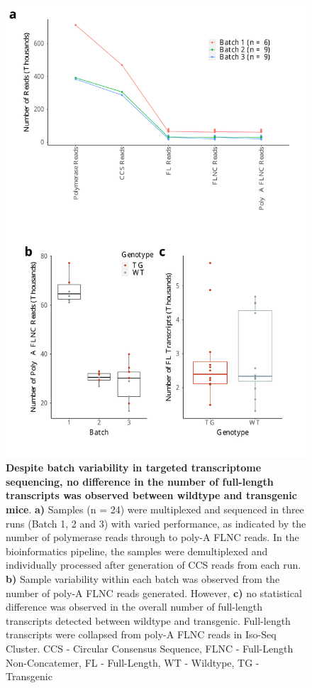 \begin{figure}[!htp]
	\begin{center}
		\includegraphics[page=1,trim={0 1cm 0 0},clip,scale = 0.55]{Figures/TargetedTranscriptome.pdf}
	\end{center}
	\captionsetup{width=0.95\textwidth}
	\caption[Targeted Transcriptome Iso-seq run performance]%
	{\textbf{Despite batch variability in targeted transcriptome sequencing, no difference in the number of full-length transcripts was observed between wildtype and transgenic mice}. \textbf{a)} Samples (n = 24) were multiplexed and sequenced in three runs (Batch 1, 2 and 3) with varied performance, as indicated by the number of polymerase reads through to poly-A FLNC reads. In the bioinformatics pipeline, the samples were demultiplexed and individually processed after generation of CCS reads from each run. \textbf{b)} Sample variability within each batch was observed from the number of poly-A FLNC reads generated. However, \textbf{c)} no statistical difference was observed in the overall number of full-length transcripts detected between wildtype and transgenic. Full-length transcripts were collapsed from poly-A FLNC reads in Iso-Seq Cluster. CCS - Circular Consensus Sequence, FLNC - Full-Length Non-Concatemer, FL - Full-Length, WT - Wildtype, TG - Transgenic}
	\label{fig:isoseq_targeted_run_output}
\end{figure}

